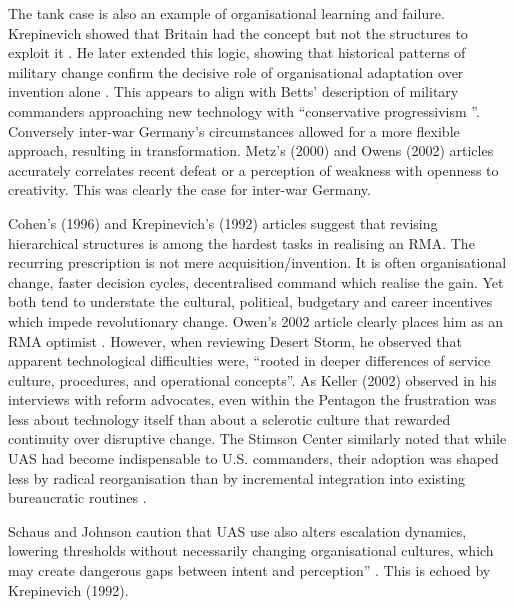 The tank case is also an example of organisational learning and failure. Krepinevich showed that Britain had the concept but not the structures to exploit it \parencite{KREPINEVICH_1992}. He later extended this logic, showing that historical patterns of military change confirm the decisive role of organisational adaptation over invention alone \parencite{KREPINEVICH_1994}. This appears to align with Betts' description of military commanders approaching new technology with ``conservative progressivism  ''\parencite{BETTS_1996}.  Conversely inter-war Germany's circumstances allowed for a more flexible approach, resulting in transformation. Metz's (2000) and Owens (2002) articles accurately correlates recent defeat or a perception of weakness with openness to creativity\nocite{METZ_2000,OWENS_2002}. This was clearly the case for inter-war Germany.



Cohen's (1996) and Krepinevich's (1992) articles suggest that revising hierarchical structures is among the hardest tasks in realising an RMA. The recurring prescription is not mere acquisition/invention. It is often organisational change, faster decision cycles, decentralised command which realise the gain. Yet both tend to understate the cultural, political, budgetary and career incentives which impede revolutionary change\nocite{COHEN_1995,COHEN_1996,KREPINEVICH_1992}. Owen's 2002 article clearly places him as an RMA optimist \nocite{OWENS_2002}. However, when reviewing Desert Storm, he observed that apparent technological difficulties were, ``rooted in deeper differences of service culture, procedures, and operational concepts''. As Keller (2002) observed in his interviews with reform advocates, even within the Pentagon the frustration was less about technology itself than about a sclerotic culture that rewarded continuity over disruptive change\nocite{KELLER_2002}. The Stimson Center similarly noted that while UAS had become indispensable to U.S. commanders, their adoption was shaped less by radical reorganisation than by incremental integration into existing bureaucratic routines \parencite{STIMSON_2015}.

 Schaus and Johnson caution that UAS use also alters escalation dynamics, lowering thresholds without necessarily changing organisational cultures, which may create dangerous gaps between intent and perception” \parencite{SCHAUS_2018}. This is echoed by Krepinevich (1992).


